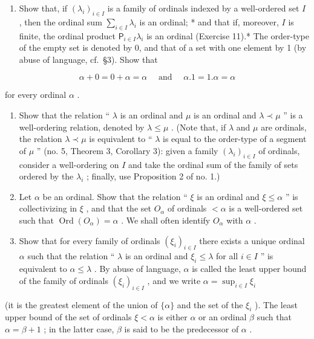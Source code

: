 \begin{enumerate}
\def\labelenumi{(\alph{enumi})}
\tightlist
\item
  Show that, if \((\lambda_{i})_{i\in I}\) is a family of ordinals indexed by a well-ordered set \(I\) , then the ordinal sum \(\sum_{i\in I}\lambda_{i}\) is an ordinal; * and that if, moreover, \(I\) is finite, the ordinal product \(\mathsf{P}_{i\in I}\lambda_{i}\) is an ordinal (Exercise 11).* The order-type of the empty set is denoted by 0, and that of a set with one element by 1 (by abuse of language, cf.~§3). Show that
\end{enumerate}

\[
\alpha + 0 = 0 + \alpha = \alpha \quad \text { and } \quad \alpha . 1 = 1. \alpha = \alpha
\]

for every ordinal \(\alpha\) .

\begin{enumerate}
\def\labelenumi{(\alph{enumi})}
\setcounter{enumi}{1}
\item
  Show that the relation `` \(\lambda\) is an ordinal and \(\mu\) is an ordinal and \(\lambda \prec \mu\) '' is a well-ordering relation, denoted by \(\lambda \leqslant \mu\) . (Note that, if \(\lambda\) and \(\mu\) are ordinals, the relation \(\lambda \prec \mu\) is equivalent to `` \(\lambda\) is equal to the order-type of a segment of \(\mu\) '' (no. 5, Theorem 3, Corollary 3): given a family \((\lambda_{i})_{i \in I}\) of ordinals, consider a well-ordering on \(I\) and take the ordinal sum of the family of sets ordered by the \(\lambda_{i}\) ; finally, use Proposition 2 of no. 1.)
\item
  Let \(\alpha\) be an ordinal. Show that the relation `` \(\xi\) is an ordinal and \(\xi \leqslant \alpha\) '' is collectivizing in \(\xi\) , and that the set \(O_{\alpha}\) of ordinals \(< \alpha\) is a well-ordered set such that \(\operatorname{Ord}(O_{\alpha}) = \alpha\) . We shall often identify \(O_{\alpha}\) with \(\alpha\) .
\item
  Show that for every family of ordinals \((\xi_{i})_{i\in I}\) there exists a unique ordinal \(\alpha\) such that the relation `` \(\lambda\) is an ordinal and \(\xi_{i}\leqslant\lambda\) for all \(i\in I\) '' is equivalent to \(\alpha\leqslant\lambda\) . By abuse of language, \(\alpha\) is called the least upper bound of the family of ordinals \((\xi_{i})_{i\in I}\) , and we write \(\alpha=\sup_{i\in I}\xi_{i}\)
\end{enumerate}

(it is the greatest element of the union of \(\{\alpha\}\) and the set of the \(\xi_{i}\) ). The least upper bound of the set of ordinals \(\xi < \alpha\) is either \(\alpha\) or an ordinal \(\beta\) such that \(\alpha = \beta + 1\) ; in the latter case, \(\beta\) is said to be the predecessor of \(\alpha\) .

